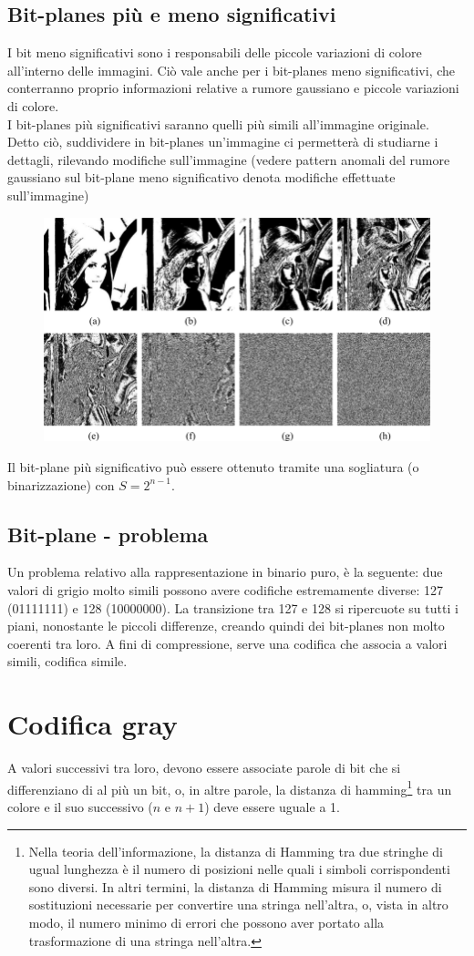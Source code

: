 \documentclass{report}
\begin{document}
	\subsection{Bit-planes più e meno significativi}
	I bit meno significativi sono i responsabili delle piccole variazioni di colore all'interno delle immagini. Ciò vale anche per i bit-planes meno significativi, che conterranno proprio informazioni relative a rumore gaussiano e piccole variazioni di colore.\\
	I bit-planes più significativi saranno quelli più simili all'immagine originale.\\
	Detto ciò, suddividere in bit-planes un'immagine ci permetterà di studiarne i dettagli, rilevando modifiche sull'immagine (vedere pattern anomali del rumore gaussiano sul bit-plane meno significativo denota modifiche effettuate sull'immagine)
	\begin{figure}[htp]
		\centering
		\includegraphics[width=0.7\linewidth]{bitplanes.png}
	\end{figure}
	Il bit-plane più significativo può essere ottenuto tramite una sogliatura (o binarizzazione) con $S=2^{n-1}$.
		
	\subsection{Bit-plane - problema}
	Un problema relativo alla rappresentazione in binario puro, è la seguente:
	due valori di grigio molto simili possono avere codifiche estremamente diverse: 127 (01111111) e 128 (10000000). La transizione tra 127 e 128 si ripercuote su tutti i piani, nonostante le piccoli differenze, creando quindi dei bit-planes non molto coerenti tra loro. A fini di compressione, serve una codifica che associa a valori simili, codifica simile.
	\section{Codifica gray}
	A valori successivi tra loro, devono essere associate parole di bit che si differenziano di al più un bit, o, in altre parole, la distanza di hamming\footnote{Nella teoria dell'informazione, la distanza di Hamming tra due stringhe di ugual lunghezza è il numero di posizioni nelle quali i simboli corrispondenti sono diversi. In altri termini, la distanza di Hamming misura il numero di sostituzioni necessarie per convertire una stringa nell'altra, o, vista in altro modo, il numero minimo di errori che possono aver portato alla trasformazione di una stringa nell'altra.} tra un colore e il suo successivo ($n$ e $n+1$) deve essere uguale a 1.
		
\end{document}
